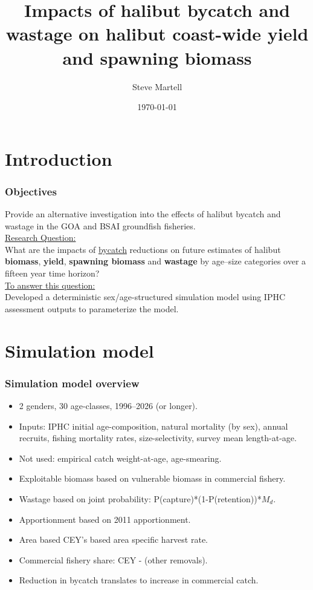 \documentclass{beamer}
\title[\iscam]{Impacts of halibut bycatch and wastage on halibut coast-wide yield and spawning biomass}
\author{Steve Martell}
\institute[UBC]
{
University of British Columbia \\
\medskip
{\emph{martell.steve@gmail.com}}
}
\date{\today}
\begin{document}
%
\begin{frame}
\titlepage
\end{frame}
%
\section{Introduction} %
\label{sec:introduction}
\begin{frame}[t]\frametitle{Objectives}
Provide an alternative investigation into the effects of halibut bycatch and wastage in the GOA and BSAI groundfish fisheries.\\
\pause \bigskip
\underline{Research Question:}\\
What are the impacts of \underline{bycatch} reductions on future estimates of halibut \textbf{biomass}, \textbf{yield}, \textbf{spawning biomass} and \textbf{wastage} by age--size categories over a fifteen year time horizon?\\
\pause \bigskip
\underline{To answer this question:}\\
Developed a deterministic sex/age-structured simulation model using IPHC assessment outputs to parameterize the model.
\end{frame}

\section{Simulation model} %
\label{sec:simulation_model}
\begin{frame}[t,shrink]\frametitle{Simulation model overview}
	\begin{itemize}
		\item<+-| alert@+> 2 genders, 30 age-classes, 1996--2026 (or longer).
		\item<+-| alert@+> Inputs: IPHC initial age-composition, natural mortality (by sex), annual recruits, fishing mortality rates, size-selectivity, survey mean length-at-age.
		\item<+-| alert@+> Not used: empirical catch weight-at-age, age-smearing.
		\item<+-| alert@+> Exploitable biomass based on vulnerable biomass in commercial fishery.
		\item<+-| alert@+> Wastage based on joint probability: P(capture)*(1-P(retention))*$M_d$.
		\item<+-| alert@+> Apportionment based on 2011 apportionment.
		\item<+-| alert@+> Area based CEY's based area specific harvest rate.
		\item<+-| alert@+> Commercial fishery share: CEY - (other removals).
		\item<+-| alert@+> \alert{Reduction in bycatch translates to increase in commercial catch.}
	\end{itemize}
\end{frame}
\end{document}
